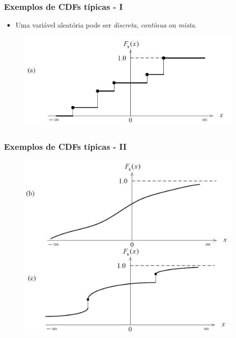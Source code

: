 \begin{frame}
    \frametitle{Exemplos de CDFs típicas - I}

    \begin{itemize}
     \item Uma variável aleatória pode ser \textit{discreta}, \textit{contínua} ou \textit{mista}.
    \end{itemize}

    \begin{figure}[t]
	  \begin{center}
	    \includegraphics[width=0.77\columnwidth]{figs/fig08}
	  \end{center}
	\end{figure}
    
\end{frame}

\begin{frame}
    \frametitle{Exemplos de CDFs típicas - II}

    \begin{figure}[t]
	  \begin{center}
	    \includegraphics[width=0.7\columnwidth]{figs/fig09}
	  \end{center}
	\end{figure}
    
\end{frame}

